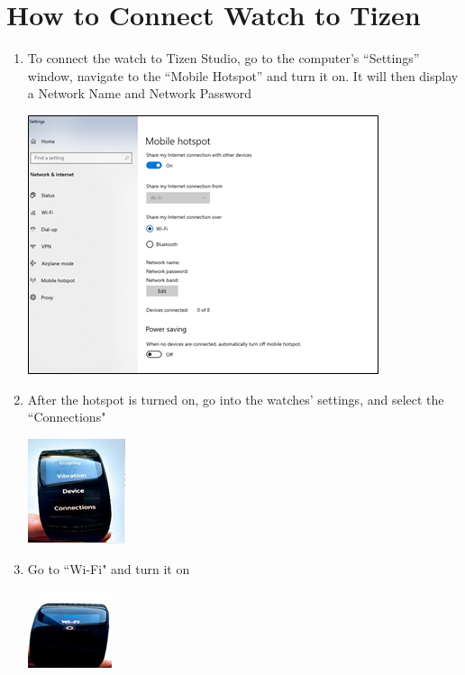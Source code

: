 \documentclass[12pt, a4paper]{article}
\begin{document}
\section{How to Connect Watch to Tizen}
\begin{enumerate}
  \item To connect the watch to Tizen Studio, go to the computer’s ``Settings” window, navigate to the “Mobile Hotspot” and turn it on. It will then display a Network Name and Network Password
      \begin{center}
    \includegraphics[width=.6\textwidth]{Pic 9.2.png}
\end{center}
  \item After the hotspot is turned on, go into the watches’ settings, and select the ``Connections"
      \begin{center}
    \includegraphics[width=.3\textwidth]{Pic 10.png}
\end{center}
\cleardoublepage
  \item Go to ``Wi-Fi" and turn it on
      \begin{center}
    \includegraphics[width=.3\textwidth]{Pic 11.png}

\end{center}
\end{enumerate}
\end{document}
